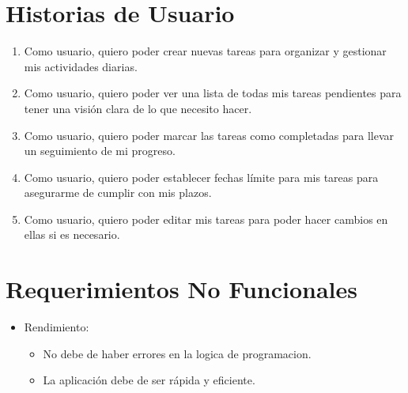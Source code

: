     \section{Historias de Usuario}
    \begin{enumerate}[start=1, label=HU\arabic*.]
        \item Como usuario, quiero poder crear nuevas tareas para organizar y gestionar mis actividades diarias.
        
        \item Como usuario, quiero poder ver una lista de todas mis tareas pendientes para tener una visión clara de lo que necesito hacer.
        
        \item Como usuario, quiero poder marcar las tareas como completadas para llevar un seguimiento de mi progreso.
        
        \item Como usuario, quiero poder establecer fechas límite para mis tareas para asegurarme de cumplir con mis plazos.

        \item Como usuario, quiero poder editar mis tareas para poder hacer cambios en ellas si es necesario.
    \end{enumerate}
\section{Requerimientos No Funcionales}
\begin{itemize}
  \item Rendimiento:
    \begin{itemize}
      \item No debe de haber errores en la logica de programacion.
      \item La aplicación debe de ser rápida y eficiente.
    \end{itemize}
\end{itemize}
